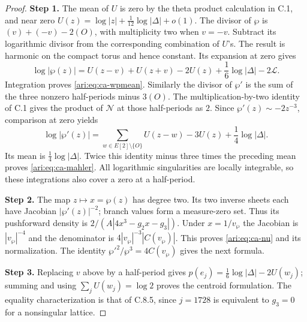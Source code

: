 \begin{proof}
\noindent\textbf{Step 1.} The mean of $U$ is zero by the theta product calculation in C.1,
and near zero
$U(z)=\log|z|+\frac1{12}\log|\Delta|+o(1)$.
The divisor of $\wp$ is $(v)+(-v)-2(O)$, with multiplicity
two when $v=-v$. Subtract its logarithmic divisor from the
corresponding combination of $U$'s. The result is harmonic
on the compact torus and hence constant. Its expansion at
zero gives
\[
 \log|\wp(z)|=U(z-v)+U(z+v)-2U(z)
                  +\frac16\log|\Delta|-2\mathcal L.
\]
Integration proves \eqref{ari:eq:ca-wpmean}.
Similarly the divisor of $\wp'$ is the sum of the three
nonzero half-periods minus $3(O)$. The multiplication-by-two
identity of C.1 gives the product of $\mathcal N$ at those half-periods
as $2$. Since $\wp'(z)\sim-2z^{-3}$, comparison at zero yields
\[
 \log|\wp'(z)|=\sum_{w\in E[2]\setminus\{O\}}U(z-w)-3U(z)
                         +\frac14\log|\Delta|.
\]
Its mean is $\frac14\log|\Delta|$. Twice this identity minus
three times the preceding mean proves \eqref{ari:eq:ca-mahler}.
All logarithmic singularities are locally integrable, so these
integrations also cover a zero at a half-period.


\noindent\textbf{Step 2.} The map $z\mapsto x=\wp(z)$ has degree two. Its two inverse
sheets each have Jacobian $|\wp'(z)|^{-2}$; branch values form
a measure-zero set. Thus its pushforward density is
$2/(A|4x^3-g_2x-g_3|)$. Under $x=1/v_{\wp}$ the Jacobian is
$|v_{\wp}|^{-4}$ and the denominator is $4|v_{\wp}|^{-3}|C(v_{\wp})|$.
This proves \eqref{ari:eq:ca-nu} and its normalization. The identity
$\wp'^2/\wp^3=4C(v_{\wp})$ gives the next formula.


\noindent\textbf{Step 3.} Replacing $v$ above by a half-period gives
$p(e_j)=\frac16\log|\Delta|-2U(w_j)$; summing and using
$\sum_jU(w_j)=\log2$ proves the centroid formulation.
The equality characterization is that of C.8.5,
since $j=1728$ is equivalent to $g_3=0$ for a nonsingular lattice.
\end{proof}

